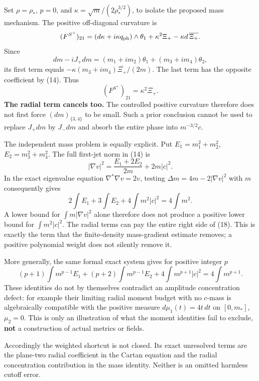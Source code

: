 \documentclass[
]{article}
\begin{document}
Set \(\rho=\rho_*\), \(p=0\), and \(\kappa=\sqrt m/(2\rho_*^{3/2})\), to
isolate the proposed mass mechanism. The positive off-diagonal curvature
is \[
 (F^{S^+})_{21}
 =(d\kappa+i\kappa q_{\rm ph})\wedge\theta_1
  +\kappa^2\Xi_+-\kappa d\,\overline{\Xi_+}.
\] Since \[
 dm-iJ_+dm=(m_1+i m_2)\theta_1+(m_3+i m_4)\theta_2,
\] its first term equals \(-\kappa(m_3+i m_4)\overline{\Xi_+}/(2m)\).
The last term has the opposite coefficient by (14). Thus \[
 \boxed{(F^{S^+})_{21}=\kappa^2\Xi_+.} \tag{16}
\] \textbf{The radial term cancels too.} The controlled positive
curvature therefore does not first force \((dm)_{\{3,4\}}\) to be small.
Such a prior conclusion cannot be used to replace \(J_+dm\) by \(J_-dm\)
and absorb the entire phase into \(m^{-3/2}c\).

The independent mass problem is equally explicit. Put
\(E_1=m_1^2+m_2^2\), \(E_2=m_3^2+m_4^2\). The full first-jet norm in
(14) is \[
 \boxed{|\nabla v|^2=\frac{E_1+2E_2}{2m}+2m|c|^2.} \tag{17}
\] In the exact eigenvalue equation \(\nabla^*\nabla v=2v\), testing
\(\Delta m=4m-2|\nabla v|^2\) with \(m\) consequently gives \[
 \boxed{2\int E_1+3\int E_2+4\int m^2|c|^2
             =4\int m^2.} \tag{18}
\] A lower bound for \(\int m|\nabla v|^2\) alone therefore does not
produce a positive lower bound for \(\int m^2|c|^2\). The radial terms
can pay the entire right side of (18). This is exactly the term that the
finite-density mass-gradient estimate removes; a positive polynomial
weight does not silently remove it.

More generally, the same formal exact system gives for positive integer
\(p\) \[
 (p+1)\int m^{p-1}E_1+(p+2)\int m^{p-1}E_2
       +4\int m^{p+1}|c|^2=4\int m^{p+1}.
\] These identities do not by themselves contradict an amplitude
concentration defect: for example their limiting radial moment budget
with no \(c\)-mass is algebraically compatible with the positive measure
\(d\mu_1(t)=4t\,dt\) on \([0,m_*]\), \(\mu_2=0\). This is only an
illustration of what the moment identities fail to exclude, \textbf{not}
a construction of actual metrics or fields.

Accordingly the weighted shortcut is not closed. Its exact unresolved
terms are the plane-two radial coefficient in the Cartan equation and
the radial concentration contribution in the mass identity. Neither is
an omitted harmless cutoff error.
\end{document}
